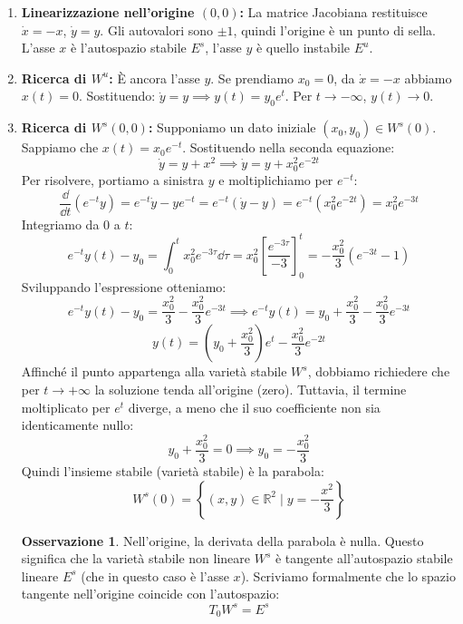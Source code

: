 \documentclass[openany]{book}
\theoremstyle{definition}
\newtheorem*{osservazione}{Osservazione}
\theoremstyle{remark}
\newcommand{\R}{\mathbb{R}}
\begin{document}
\begin{enumerate}
    \item \textbf{Linearizzazione nell'origine $(0,0)$:}
    La matrice Jacobiana restituisce $\dot{x} = -x$, $\dot{y} = y$. Gli autovalori sono $\pm 1$, quindi l'origine è un punto di sella. L'asse $x$ è l'autospazio stabile $E^s$, l'asse $y$ è quello instabile $E^u$.
    
    \item \textbf{Ricerca di $W^u$:}
    È ancora l'asse $y$. Se prendiamo $x_0 = 0$, da $\dot{x} = -x$ abbiamo $x(t) = 0$. Sostituendo: $\dot{y} = y \implies y(t) = y_0 e^t$. Per $t \to -\infty$, $y(t) \to 0$.
    
    \item \textbf{Ricerca di $W^s(0,0)$:}
    Supponiamo un dato iniziale $(x_0, y_0) \in W^s(0)$. Sappiamo che $x(t) = x_0 e^{-t}$. Sostituendo nella seconda equazione:
    \[
    \dot{y} = y + x^2 \implies \dot{y} = y + x_0^2 e^{-2t}
    \]
    Per risolvere, portiamo a sinistra $y$ e moltiplichiamo per $e^{-t}$:
    \[
    \frac{\dd}{\dd t} (e^{-t}y) = e^{-t}\dot{y} - y e^{-t} = e^{-t}(\dot{y} - y) = e^{-t}(x_0^2 e^{-2t}) = x_0^2 e^{-3t}
    \]
    Integriamo da $0$ a $t$:
    \[
    e^{-t}y(t) - y_0 = \int_{0}^{t} x_0^2 e^{-3\tau} \dd\tau = x_0^2 \left[ \frac{e^{-3\tau}}{-3} \right]_0^t = -\frac{x_0^2}{3}(e^{-3t} - 1)
    \]
    Sviluppando l'espressione otteniamo:
    \[
    e^{-t}y(t) - y_0 = \frac{x_0^2}{3} - \frac{x_0^2}{3}e^{-3t} \implies e^{-t}y(t) = y_0 + \frac{x_0^2}{3} - \frac{x_0^2}{3}e^{-3t}
    \]
\begin{equation}
y(t) = \left(y_0 + \frac{x_0^2}{3}\right)e^{t} - \frac{x_0^2}{3}e^{-2t}
\end{equation}
Affinché il punto appartenga alla varietà stabile $W^s$, dobbiamo richiedere che per $t \to +\infty$ la soluzione tenda all'origine (zero). Tuttavia, il termine moltiplicato per $e^t$ diverge, a meno che il suo coefficiente non sia identicamente nullo:
\[
y_0 + \frac{x_0^2}{3} = 0 \implies y_0 = -\frac{x_0^2}{3}
\]
Quindi l'insieme stabile (varietà stabile) è la parabola:
\[
W^s(0) = \left\{ (x,y) \in \R^2 \;\bigg|\; y = -\frac{x^2}{3} \right\}
\]

\begin{osservazione}
Nell'origine, la derivata della parabola è nulla. Questo significa che la varietà stabile non lineare $W^s$ è tangente all'autospazio stabile lineare $E^s$ (che in questo caso è l'asse $x$). Scriviamo formalmente che lo spazio tangente nell'origine coincide con l'autospazio:
\[
T_0 W^s = E^s
\]
\end{osservazione}


\end{enumerate}
\end{document}

